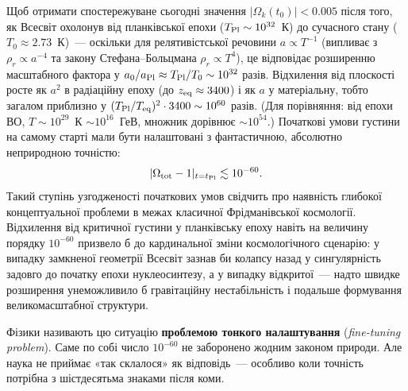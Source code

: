 Щоб отримати спостережуване сьогодні значення $|\Omega_k(t_0)| < 0.005$
після того, як Всесвіт охолонув від планківської епохи
($T_{\rm Pl} \sim 10^{32}$~К) до сучасного стану ($T_0 \approx 2.73$~К)~---
оскільки для релятивістської речовини $a \propto T^{-1}$
(випливає з $\rho_r \propto a^{-4}$ та закону Стефана--Больцмана
$\rho_r \propto T^4$), це відповідає розширенню масштабного фактора
у $a_0/a_{\rm Pl} \approx T_{\rm Pl}/T_0 \sim 10^{32}$ разів. Відхилення від плоскості
росте як $a^2$ в радіаційну епоху (до $z_{\rm eq}\approx3400$) і як $a$ у матеріальну,
тобто загалом приблизно у $(T_{\rm Pl}/T_{\rm eq})^2\cdot 3400 \sim 10^{60}$ разів.
(Для порівняння: від епохи ВО, $T\sim10^{29}$~К $\sim10^{16}$~ГеВ, множник дорівнює $\sim10^{54}$.)
Початкові умови густини на самому старті мали бути налаштовані з фантастичною,
абсолютно неприродною точністю:
\begin{equation*}
  |\Omega_{\rm tot} - 1|_{t = t_{\rm Pl}} \lesssim 10^{-60}.
\end{equation*}
Такий ступінь узгодженості початкових умов свідчить про наявність глибокої
концептуальної проблеми в межах класичної Фрідманівської космології. Відхилення
від критичної густини у планківську епоху навіть на величину порядку $10^{-60}$
призвело б до кардинальної зміни космологічного сценарію: у випадку замкненої
геометрії Всесвіт зазнав би колапсу назад у сингулярність задовго до початку
епохи нуклеосинтезу, а у випадку відкритої~--- надто швидке розширення унеможливило
б гравітаційну нестабільність і подальше формування великомасштабної структури.

Фізики називають цю ситуацію \textbf{проблемою тонкого налаштування}
(\emph{fine-tuning problem}).
Саме по собі число $10^{-60}$ не заборонено жодним законом природи.
Але наука не приймає «так склалося» як відповідь~--- особливо
коли точність потрібна з шістдесятьма знаками після коми.


